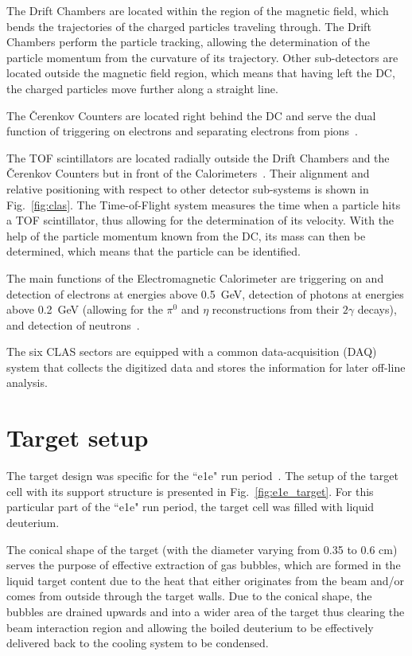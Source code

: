 The Drift Chambers are located within the region of the magnetic field, which bends the trajectories of the charged particles traveling through. The Drift Chambers perform the particle tracking, allowing the determination of the particle momentum from the curvature of its trajectory. Other sub-detectors are located outside the magnetic field region, which means that having left the DC, the charged particles move further along a straight line.

The \v Cerenkov Counters are located right behind the DC and serve the dual function of triggering on electrons and separating electrons from pions~\cite{Adams:2001kk}. 

The TOF scintillators are located radially outside the Drift Chambers and the \v Cerenkov Counters but in front of the Calorimeters~\cite{Smith:1999ii, clas_tof_paddles}. Their alignment and relative positioning with respect to other detector sub-systems is shown in Fig.~\ref{fig:clas}. The Time-of-Flight system measures the time when a particle hits a TOF scintillator, thus allowing for the determination of its velocity. With the help of the particle momentum known from the DC, its mass can then be determined, which means that the particle can be identified.

The main functions of the Electromagnetic Calorimeter are triggering on and detection of electrons at energies above 0.5~GeV, detection of photons at energies above 0.2~GeV (allowing for the $\pi^{0}$ and $\eta$ reconstructions from their $2\gamma$ decays), and detection of neutrons~\cite{Amarian:2001zs}. 

The six CLAS sectors are equipped with a common data-acquisition (DAQ) system that collects the digitized data and stores the information for later off-line analysis.


\newpage
\section{Target setup}
\label{Sect:target}



The target design was specific for the ``e1e" run period~\cite{target}. The setup of the target cell with its support structure is presented in Fig.~\ref{fig:e1e_target}. For this particular part of the ``e1e" run period, the target cell was filled with liquid deuterium.



The conical shape of the target (with the diameter varying from 0.35 to 0.6 cm) serves the purpose of effective extraction of gas bubbles, which are formed in the liquid target content due to the heat that either originates from the beam and/or comes from outside through the target walls. Due to the conical shape, the bubbles are drained upwards and into a wider area of the target thus clearing the beam interaction region and allowing the boiled deuterium to be effectively delivered back to the cooling system to be condensed. 



